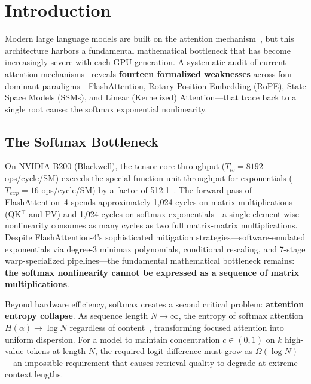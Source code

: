 \documentclass[11pt,a4paper]{article}
\theoremstyle{remark}
\begin{document}
\section{Introduction}

Modern large language models are built on the attention mechanism~\cite{vaswani2017attention}, but this architecture harbors a fundamental mathematical bottleneck that has become increasingly severe with each GPU generation. A systematic audit of current attention mechanisms~\cite{dao2022flashattention,dao2026flashattention4,gu2023mamba,choromanski2021rethinking} reveals \textbf{fourteen formalized weaknesses} across four dominant paradigms---FlashAttention, Rotary Position Embedding (RoPE), State Space Models (SSMs), and Linear (Kernelized) Attention---that trace back to a single root cause: the softmax exponential nonlinearity.

\subsection{The Softmax Bottleneck}

On NVIDIA B200 (Blackwell), the tensor core throughput ($T_{tc} = 8192$ ops/cycle/SM) exceeds the special function unit throughput for exponentials ($T_{exp} = 16$ ops/cycle/SM) by a factor of 512:1~\cite{dao2026flashattention4}. The forward pass of FlashAttention~4 spends approximately 1,024 cycles on matrix multiplications (QK$^\top$ and PV) and 1,024 cycles on softmax exponentials---a single element-wise nonlinearity consumes as many cycles as two full matrix-matrix multiplications. Despite FlashAttention-4's sophisticated mitigation strategies---software-emulated exponentials via degree-3 minimax polynomials, conditional rescaling, and 7-stage warp-specialized pipelines---the fundamental mathematical bottleneck remains: \textbf{the softmax nonlinearity cannot be expressed as a sequence of matrix multiplications}.

Beyond hardware efficiency, softmax creates a second critical problem: \textbf{attention entropy collapse}. As sequence length $N \to \infty$, the entropy of softmax attention $H(\alpha) \to \log N$ regardless of content~\cite{li2025information,lin2025critical}, transforming focused attention into uniform dispersion. For a model to maintain concentration $c \in (0,1)$ on $k$ high-value tokens at length $N$, the required logit difference must grow as $\Omega(\log N)$---an impossible requirement that causes retrieval quality to degrade at extreme context lengths.
\end{document}

